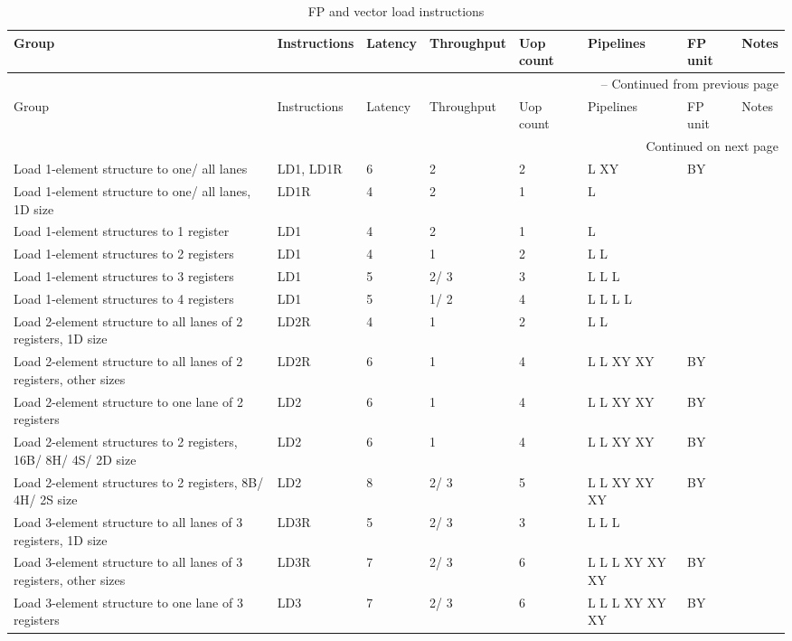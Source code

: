 \begin{longtable}{|p{1in}|p{1in}|l|l|l|p{1in}|l|p{1in}|}
\caption{FP and vector load instructions} \\
\hline
Group & Instructions & Latency & Throughput & Uop count & Pipelines & FP unit & Notes\\
\hline
\endfirsthead
\hline
\multicolumn{8}{|r|}{{\tablename\ \thetable{} -- Continued from previous page}} \\
\hline
Group & Instructions & Latency & Throughput & Uop count & Pipelines & FP unit & Notes\\
\hline
\endhead
\hline
\multicolumn{8}{|r|}{{Continued on next page}} \\
\hline
\endfoot
\hline
\endlastfoot
Load 1-element structure to one/ all lanes & LD1, LD1R & 6 & 2 & 2 & L XY & BY & \\
\hline
Load 1-element structure to one/ all lanes, 1D size & LD1R & 4 & 2 & 1 & L &  & \\
\hline
Load 1-element structures to 1 register & LD1 & 4 & 2 & 1 & L &  & \\
\hline
Load 1-element structures to 2 registers & LD1 & 4 & 1 & 2 & L L &  & \\
\hline
Load 1-element structures to 3 registers & LD1 & 5 & 2/ 3 & 3 & L L L &  & \\
\hline
Load 1-element structures to 4 registers & LD1 & 5 & 1/ 2 & 4 & L L L L &  & \\
\hline
Load 2-element structure to all lanes of 2 registers, 1D size & LD2R & 4 & 1 & 2 & L L &  & \\
\hline
Load 2-element structure to all lanes of 2 registers, other sizes & LD2R & 6 & 1 & 4 & L L XY XY & BY & \\
\hline
Load 2-element structure to one lane of 2 registers & LD2 & 6 & 1 & 4 & L L XY XY & BY & \\
\hline
Load 2-element structures to 2 registers, 16B/ 8H/ 4S/ 2D size & LD2 & 6 & 1 & 4 & L L XY XY & BY & \\
\hline
Load 2-element structures to 2 registers, 8B/ 4H/ 2S size & LD2 & 8 & 2/ 3 & 5 & L L XY XY XY & BY & \\
\hline
Load 3-element structure to all lanes of 3 registers, 1D size & LD3R & 5 & 2/ 3 & 3 & L L L &  & \\
\hline
Load 3-element structure to all lanes of 3 registers, other sizes & LD3R & 7 & 2/ 3 & 6 & L L L XY XY XY & BY & \\
\hline
Load 3-element structure to one lane of 3 registers & LD3 & 7 & 2/ 3 & 6 & L L L XY XY XY & BY & \\

\end{longtable}
